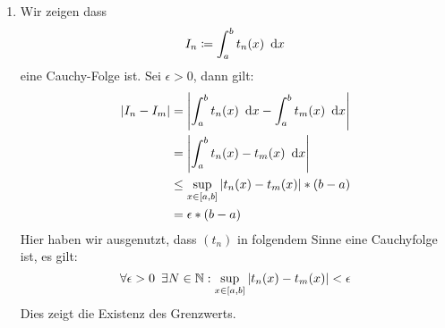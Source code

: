 \begin{beweis}{}
	\begin{enumerate}
		\item Wir zeigen dass
		\begin{equation*}
			I_n\coloneqq \int_a^b t_n(x)\ \operatorname{d}\! x
		\end{equation*}
		eine Cauchy-Folge ist. Sei $\epsilon>0$, dann gilt:
		\begin{align*}
			|I_n-I_m|&=\left|\int_a^b t_n(x)\ \operatorname{d}\! x-\int_a^b t_m(x)\ \operatorname{d}\! x\right|\\
			&=\left|\int_a^b t_n(x)-t_m(x)\ \operatorname{d}\! x\right|\\
			&\leq \sup_{x\in[a,b]}|t_n(x)-t_m(x)|*(b-a)\\
			&=\epsilon*(b-a)
		\end{align*}
		Hier haben wir ausgenutzt, dass $(t_n)$ in folgendem Sinne eine Cauchyfolge ist, es gilt:
		\begin{equation*}
			\forall \epsilon>0 \enspace\exists N\in\mathbb{N}:\sup_{x\in[a,b]}|t_n(x)-t_m(x)|<\epsilon
		\end{equation*}
		Dies zeigt die Existenz des Grenzwerts.
	\end{enumerate}
\end{beweis}
